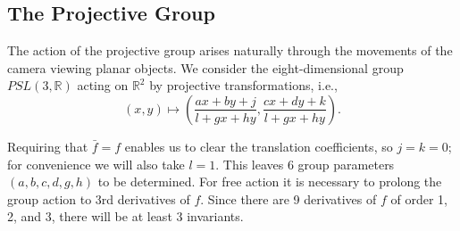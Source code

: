 \documentclass[review,onefignum,onetabnum]{siamonline190516}
\def\R{\mathbb{R}}
\begin{document}




\subsection{The Projective Group}

The action of the projective group arises naturally through the movements of the camera viewing planar objects.
We consider the eight-dimensional group $PSL(3,\R)$ acting on $\R^2$ by projective transformations, i.e., 
\begin{equation}
(x,y) \mapsto \left(\frac{a x + b y + j}{l + g x + h y}, \frac{c x + d y + k}{l+ g x + h y}\right).
\end{equation}

Requiring that $\bar f = f$ enables us to clear the translation coefficients, so $j=k=0$; for convenience we will also take $l=1$. This leaves 6 group parameters $(a,b,c,d,g,h)$ to be determined. For free action it is necessary to prolong the group action to 3rd derivatives of $f$. Since there are 9 derivatives of $f$ of order 1, 2, and 3, there will be at least 3 invariants.
\end{document}
